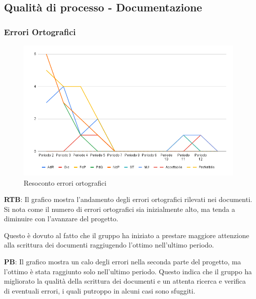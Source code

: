 \subsection{Qualità di processo - Documentazione}

\vspace{0.3cm}

\subsubsection{Errori Ortografici}

\vspace{0.3cm}

\begin{figure}[H]
    \centering
    \includegraphics[width=1\textwidth]{../Images/PianoDiQualifica/errori_ortografici.png}
    \caption{Resoconto errori ortografici}
    \label{fig:Errori ortografici}
\end{figure}

\vspace{0.2cm}

\textbf{RTB}: Il grafico mostra l'andamento degli errori ortografici rilevati nei documenti. Si nota come il numero di errori ortografici sia inizialmente alto, ma tenda a diminuire con l'avanzare del progetto.

\vspace{0.2cm}

Questo è dovuto al fatto che il gruppo ha iniziato a prestare maggiore attenzione alla scrittura dei documenti raggiugendo l'ottimo nell'ultimo periodo.

\vspace{0.2cm}
\textbf{PB}: Il grafico mostra un calo degli errori nella seconda parte del progetto, ma l'ottimo è stata raggiunto solo nell'ultimo periodo. Questo indica che il gruppo ha migliorato la qualità della scrittura dei documenti e un attenta ricerca e verifica di eventuali errori, i quali putroppo in alcuni casi sono sfuggiti. 
